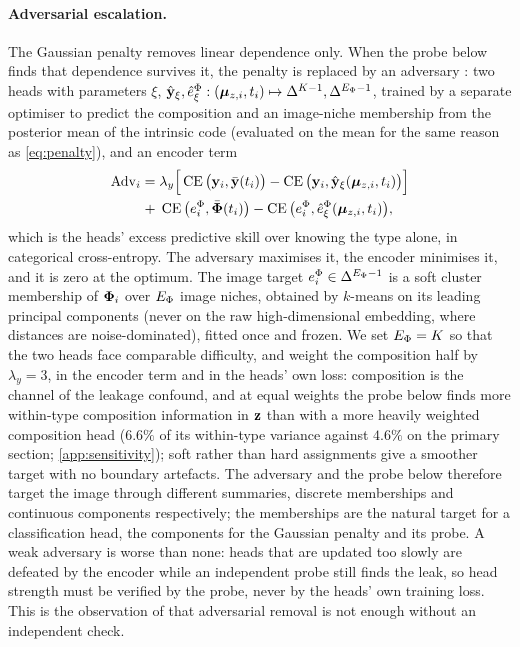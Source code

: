 \paragraph{Adversarial escalation.}
 The Gaussian penalty removes linear dependence only. When the probe below finds that dependence survives it, the penalty is replaced by an adversary \citep{louizos2016,xie2017,ganin2016,zhang2018mitigating}: two heads with parameters $\xi$, $\hat{\mathbf{y}}_\xi, \hat{e}^{\Phi}_\xi : (\boldsymbol{\mu}_{z,i}, t_i) \mapsto \Delta^{K-1}, \Delta^{E_{\Phi}-1}$, trained by a separate optimiser to predict the composition and an image-niche membership from the posterior mean of the intrinsic code (evaluated on the mean for the same reason as \cref{eq:penalty}), and an encoder term
\begin{equation}
\begin{split}
  \mathrm{Adv}_i = \;&\lambda_y\Big[\operatorname{CE}\big(\mathbf{y}_i, \bar{\mathbf{y}}(t_i)\big) - \operatorname{CE}\big(\mathbf{y}_i, \hat{\mathbf{y}}_\xi(\boldsymbol{\mu}_{z,i}, t_i)\big)\Big] \\
  +\;&\operatorname{CE}\big(e^{\Phi}_i, \bar{\boldsymbol{\Phi}}(t_i)\big) - \operatorname{CE}\big(e^{\Phi}_i, \hat{e}^{\Phi}_\xi(\boldsymbol{\mu}_{z,i}, t_i)\big),
\end{split}
\label{eq:adv}
\end{equation}
which is the heads' excess predictive skill over knowing the type alone, in categorical cross-entropy. The adversary maximises it, the encoder minimises it, and it is zero at the optimum. The image target $e^{\Phi}_i \in \Delta^{E_{\Phi}-1}$ is a soft cluster membership of $\boldsymbol{\Phi}_i$ over $E_{\Phi}$ image niches, obtained by $k$-means on its leading principal components (never on the raw high-dimensional embedding, where distances are noise-dominated), fitted once and frozen. We set $E_{\Phi} = K$ so that the two heads face comparable difficulty, and weight the composition half by $\lambda_y = 3$, in the encoder term and in the heads' own loss: composition is the channel of the leakage confound, and at equal weights the probe below finds more within-type composition information in $\mathbf{z}$ than with a more heavily weighted composition head ($6.6\%$ of its within-type variance against $4.6\%$ on the primary section; \cref{app:sensitivity}); soft rather than hard assignments give a smoother target with no boundary artefacts. The adversary and the probe below therefore target the image through different summaries, discrete memberships and continuous components respectively; the memberships are the natural target for a classification head, the components for the Gaussian penalty and its probe. A weak adversary is worse than none: heads that are updated too slowly are defeated by the encoder while an independent probe still finds the leak, so head strength must be verified by the probe, never by the heads' own training loss. This is the observation of \citet{elazar2018} that adversarial removal is not enough without an independent check.

